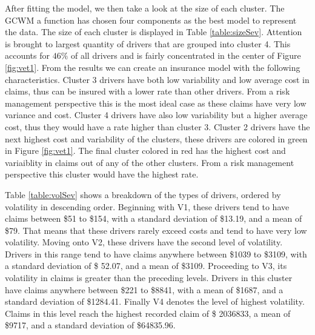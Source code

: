 \documentclass[11pt,letterpaper]{article}
\numberwithin{equation}{section}
\numberwithin{equation}{section}
\numberwithin{equation}{section}
\begin{document}
After fitting the model, we then take a look at the size of each cluster. The GCWM a function has chosen four components as the best model to represent the data. The size of each cluster is displayed in Table \ref{table:sizeSev}. Attention is brought to largest quantity  of drivers that are grouped into cluster 4. This accounts for $ 46 \% $ of all drivers and is fairly concentrated in the center of Figure \ref{fig:vet1}.
From the results we can create an insurance model with the following characteristics. Cluster 3 drivers have both low variability and low average cost in claims, thus can be insured with a lower rate than other drivers. From a risk management perspective this is the most ideal case as these claims have very low variance and cost. Cluster 4 drivers have also low variability but a higher average cost, thus they would have a rate higher than cluster 3. Cluster 2 drivers have the next highest cost and variability of the clusters, these drivers are colored in green in Figure \ref{fig:vet1}. The final cluster colored in red has the highest cost and variaiblity in claims out of any of the other clusters. From a risk management perspective this cluster would have the highest rate. 
\begin{table}[!htb]
\centering
\caption{Summarized volatility information of each cluster for Claims.}
\label{table:volSev}
\end{table}



Table \ref{table:volSev} shows a breakdown of the types of drivers, ordered by volatility in descending order. Beginning with V1, these drivers tend to have claims between \$51 to \$154, with a standard deviation of \$13.19, and a mean of \$79. That means that these drivers rarely exceed costs and tend to have very low volatility. Moving onto V2, these drivers have the second level of volatility. Drivers in this range tend to have claims anywhere between \$1039 to \$3109, with a standard deviation of \$ 52.07, and a mean of \$3109.  Proceeding to V3, its volatility in claims is greater than the preceding levels. Drivers in this cluster have claims anywhere between \$221 to \$8841, with a mean of \$1687, and a standard deviation of \$1284.41. Finally V4 denotes the level of highest volatility. Claims in this level  reach the highest recorded claim of \$ 2036833, a mean of \$9717, and a standard deviation of \$64835.96.
\end{document}

